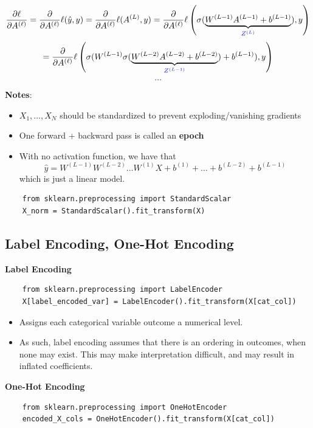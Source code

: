 \documentclass{article}
\begin{document}
\[
    \frac{\partial \ell}{\partial A^{(\ell)}} = \frac{\partial}{\partial A^{(\ell)}} \ell(\hat{y}, y) = \frac{\partial}{\partial A^{(\ell)}} \ell(A^{(L)}, y) = \frac{\partial}{\partial A^{(\ell)}} \ell\left(\sigma(\underbrace{W^{(L-1)}A^{(L-1)} + b^{(L-1)}}_{\textcolor{blue}{Z^{(L)}}}), y\right)
\]
\[
    = \frac{\partial}{\partial A^{(\ell)}} \ell\left(\sigma(W^{(L-1)}\sigma(\underbrace{W^{(L-2)}A^{(L-2)} + b^{(L-2)}}_{\textcolor{blue}{Z^{(L-1)}}}) + b^{(L-1)}), y\right)
\]
\[
    \ldots
\]

\textbf{Notes}:
\begin{itemize}
    \item $X_1, \ldots, X_N$ should be standardized to prevent exploding/vanishing gradients
    \item One forward + backward pass is called an \textbf{epoch}
    \item With no activation function, we have that
        \[
            \hat{y} = W^{(L-1)}W^{(L-2)}\ldots W^{(1)}X + b^{(1)} + \ldots + b^{(L-2)} + b^{(L-1)}
        \]
        which is just a linear model.
\end{itemize}

\begin{verbatim}
    from sklearn.preprocessing import StandardScalar
    X_norm = StandardScalar().fit_transform(X)
\end{verbatim}

\subsection{Label Encoding, One-Hot Encoding}

\textbf{Label Encoding}
\begin{verbatim}
    from sklearn.preprocessing import LabelEncoder
    X[label_encoded_var] = LabelEncoder().fit_transform(X[cat_col])
\end{verbatim}

\begin{itemize}
    \item Assigns each categorical variable outcome a numerical level.
    \item As such, label encoding assumes that there is an ordering in outcomes, when none may exist. This may
    make interpretation difficult, and may result in inflated coefficients.
\end{itemize}

\noindent\textbf{One-Hot Encoding}
\begin{verbatim}
    from sklearn.preprocessing import OneHotEncoder
    encoded_X_cols = OneHotEncoder().fit_transform(X[cat_col])
\end{verbatim}
\end{document}

